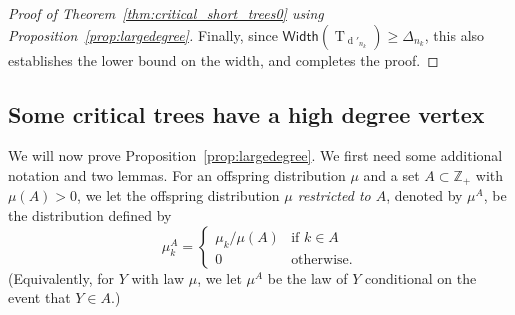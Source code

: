 \documentclass[AHL,Unicode,longabstracts,published]{cedram}
\newcommand{\Z}{\mathbb{Z}}
\newcommand{\Width}{\mathsf{Width}}
\DeclareMathOperator{\rtree}{T}
\DeclareMathOperator{\dseq}{d}
\begin{document}
\begin{proof}[Proof of Theorem~\ref{thm:critical_short_trees0} {using Proposition~\ref{prop:largedegree}}]
Finally, since $\Width(\rtree_{\dseq'_{n_k}}) \ge \Delta_{n_k}$, this also establishes the lower bound on the width, and completes the proof.
\end{proof}

\subsection{{Some critical trees have a high degree vertex}}

We will now prove Proposition~\ref{prop:largedegree}. We first need some additional notation and two lemmas. For an offspring distribution $\mu$ and a set $A\subset \Z_+$ with $\mu(A)>0$, we let the offspring distribution \emph{$\mu$ restricted to $A$}, denoted by $\mu^A$, be the distribution defined by
\[
\mu^A _{k}=
\begin{cases}\mu_k/\mu(A)&\text{if }k\in A \\ 0&
\text{otherwise.}
\end{cases}
\]
(Equivalently, for $Y$ with law $\mu$, we let $\mu^A$ be the law of $Y$ conditional on the event that $Y\in A$.)
\end{document}
